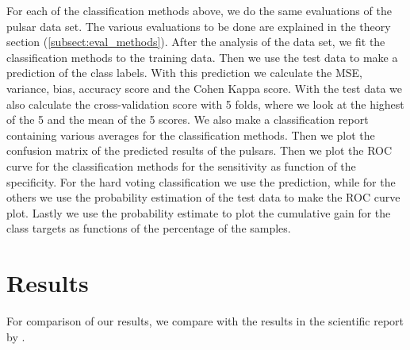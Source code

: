 \documentclass[12pt,a4paper,english]{article}
\begin{document}
For each of the classification methods above, we do the same evaluations of the pulsar data set. The various evaluations to be done are explained in the theory section (\ref{subsect:eval_methods}). After the analysis of the data set, we fit the classification methods to the training data. Then we use the test data to make a prediction of the class labels. With this prediction we calculate the MSE, variance, bias, accuracy score and the Cohen Kappa score. With the test data we also calculate the cross-validation score with 5 folds, where we look at the highest of the 5 and the mean of the 5 scores. We also make a classification report containing various averages for the classification methods. Then we plot the confusion matrix of the predicted results of the pulsars. Then we plot the ROC curve for the classification methods for the sensitivity as function of the specificity. For the hard voting classification we use the prediction, while for the others we use the probability estimation of the test data to make the ROC curve plot. Lastly we use the probability estimate to plot the cumulative gain for the class targets as functions of the percentage of the samples.

\section{Results}
\label{sect:Results}
For comparison of our results, we compare with the results in the scientific report by \citet{pulsar_art}.
\end{document}
